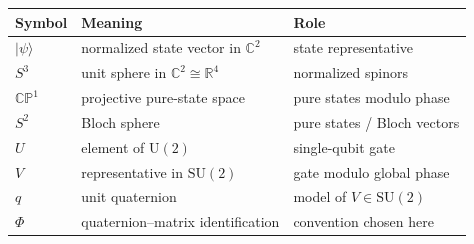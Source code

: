 \documentclass[11pt]{article}
\theoremstyle{remark}
\newcommand{\R}{\mathbb{R}}
\newcommand{\C}{\mathbb{C}}
\newcommand{\CP}{\mathbb{CP}}
\newcommand{\SU}{\mathrm{SU}}
\newcommand{\U}{\mathrm{U}}
\newcommand{\ket}[1]{\lvert #1 \rangle}
\begin{document}
\begin{center}
\begin{tabular}{@{}lll@{}}
\toprule
Symbol & Meaning & Role \\
\midrule
$\ket{\psi}$ & normalized state vector in $\C^2$ & state representative \\
$S^3$ & unit sphere in $\C^2\cong\R^4$ & normalized spinors \\
$\CP^1$ & projective pure-state space & pure states modulo phase \\
$S^2$ & Bloch sphere & pure states / Bloch vectors \\
$U$ & element of $\U(2)$ & single-qubit gate \\
$V$ & representative in $\SU(2)$ & gate modulo global phase \\
$q$ & unit quaternion & model of $V\in\SU(2)$ \\
$\Phi$ & quaternion--matrix identification & convention chosen here \\
\bottomrule
\end{tabular}
\end{center}

\clearpage


\end{document}
